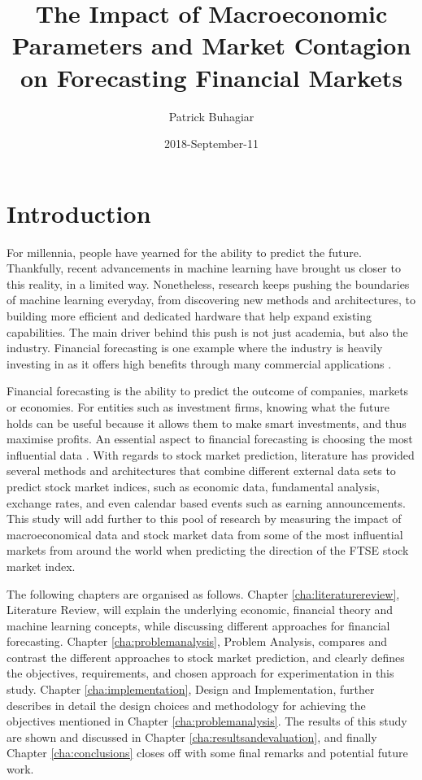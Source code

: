 \documentclass{UoYCSproject}
\author{Patrick Buhagiar}
\title{The Impact of Macroeconomic Parameters and Market Contagion on Forecasting Financial Markets}
\date{2018-September-11}
\begin{document}
\maketitle

\listoffigures
\listoftables

\label{sec:start}
\thispagestyle{empty}\cleardoublepage

\chapter{Introduction}
\label{cha:Introduction}
For millennia, people have yearned for the ability to predict the future. Thankfully, recent advancements in machine learning have brought us closer to this reality, in a limited way. Nonetheless, research keeps pushing the boundaries of machine learning everyday, from discovering new methods and architectures, to building more efficient and dedicated hardware that help expand existing capabilities. The main driver behind this push is not just academia, but also the industry.  Financial forecasting is one example where the industry is heavily investing in as it offers high benefits through many commercial applications \cite{majhi2007stock}.

Financial forecasting is the ability to predict the outcome of companies, markets or economies. For entities such as investment firms, knowing what the future holds can be useful because it allows them to make smart investments, and thus maximise profits. An essential aspect to financial forecasting is choosing the most influential data \cite{zhong2017forecasting}. With regards to stock market prediction, literature has provided several methods and architectures that combine different external data sets to predict stock market indices, such as economic data, fundamental analysis, exchange rates, and even calendar based events such as earning announcements. This study will add further to this pool of research by measuring the impact of macroeconomical data and stock market data from some of the most influential markets from around the world when predicting the direction of the FTSE stock market index.   

The following chapters are organised as follows. Chapter \ref{cha:literaturereview}, Literature Review, will explain the underlying economic, financial theory and machine learning concepts, while discussing different approaches for financial forecasting. Chapter \ref{cha:problemanalysis}, Problem Analysis, compares and contrast the different approaches to stock market prediction, and clearly defines the objectives, requirements, and chosen approach for experimentation in this study. Chapter \ref{cha:implementation}, Design and Implementation, further describes in detail the design choices and methodology for achieving the objectives mentioned in Chapter \ref{cha:problemanalysis}. The results of this study are shown and discussed in Chapter \ref{cha:resultsandevaluation}, and finally Chapter \ref{cha:conclusions} closes off with some final remarks and potential future work. 
\end{document}
